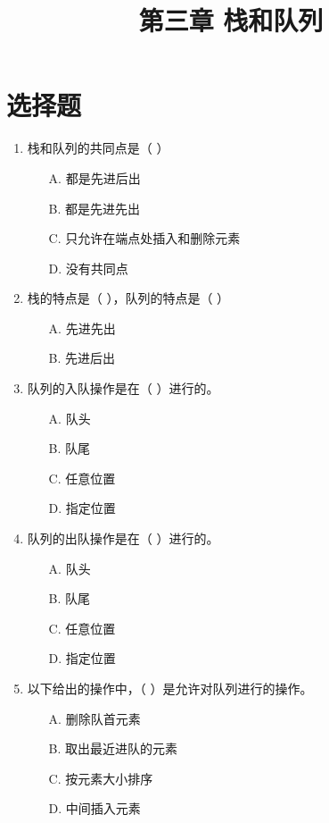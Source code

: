 \documentclass[12pt, a4paper]{article}
\title{\textbf{第三章 栈和队列}}
\author{}
\date{}
\begin{document}
\section*{选择题}

\begin{enumerate}[label=\arabic*.]
	\item 栈和队列的共同点是（ ）
	      \begin{enumerate}
		      \item[A.] 都是先进后出
		      \item[B.] 都是先进先出
		      \item[C.] 只允许在端点处插入和删除元素
		      \item[D.] 没有共同点
	      \end{enumerate}

	\item 栈的特点是（ ），队列的特点是（ ）
	      \begin{enumerate}
		      \item[A.] 先进先出
		      \item[B.] 先进后出
	      \end{enumerate}

	\item 队列的入队操作是在（ ）进行的。
	      \begin{enumerate}
		      \item[A.] 队头
		      \item[B.] 队尾
		      \item[C.] 任意位置
		      \item[D.] 指定位置
	      \end{enumerate}

	\item 队列的出队操作是在（ ）进行的。
	      \begin{enumerate}
		      \item[A.] 队头
		      \item[B.] 队尾
		      \item[C.] 任意位置
		      \item[D.] 指定位置
	      \end{enumerate}

	\item 以下给出的操作中，（ ）是允许对队列进行的操作。
	      \begin{enumerate}
		      \item[A.] 删除队首元素
		      \item[B.] 取出最近进队的元素
		      \item[C.] 按元素大小排序
		      \item[D.] 中间插入元素
	      \end{enumerate}


\end{enumerate}
\end{document}
